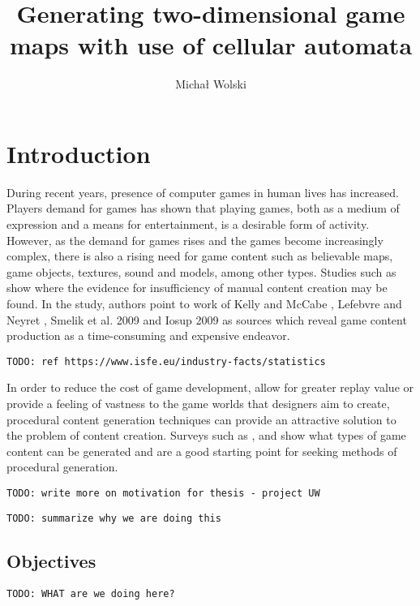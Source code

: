 \documentclass[12pt]{report}
\title{Generating two-dimensional game maps with use of cellular automata}
\author{Michał Wolski}
\newcommand{\todo}[1]{}
\renewcommand{\todo}[1]{{\color{red} \par \noindent \footnotesize \texttt{TODO: {#1} }}}
\begin{document}
 
\maketitle
\tableofcontents 

\chapter{Introduction} \label{rozdzial.wstep} 
 
During recent years, presence of computer games in human lives has increased. Players demand for games has shown that playing games, both as a medium of expression and a means for entertainment, is a desirable form of activity. However, as the demand for games rises and the games become increasingly complex, there is also a rising need for game content such as believable maps, game objects, textures, sound and models, among other types. Studies such as \autocite{hendrikx2013procedural} show where the evidence for insufficiency of manual content creation may be found. In the study, authors point to work of Kelly and McCabe \autocite{kelly2007citygen}, Lefebvre and Neyret \autocite{lefebvre2003pattern}, Smelik et al. 2009 \autocite{smelik2009survey} and Iosup 2009 \autocite{iosup2009poggi} as sources which reveal game content production as a time-consuming and expensive endeavor.



\todo{ref https://www.isfe.eu/industry-facts/statistics}

In order to reduce the cost of game development, allow for greater replay value or provide a feeling of vastness to the game worlds that designers aim to create, procedural content generation techniques can provide an attractive solution to the problem of content creation. Surveys such as \autocite{hendrikx2013procedural}, \autocite{togelius2011search} and \autocite{de2011survey} show what types of game content can be generated and are a good starting point for seeking methods of procedural generation.


\todo{write more on motivation for thesis - project UW}
\todo{summarize why we are doing this}



\section{Objectives}

\todo{WHAT are we doing here?}
\end{document}
